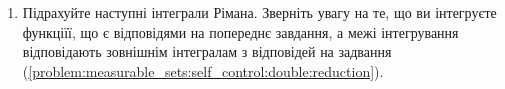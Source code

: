 \begin{enumerate}
\begin{enumerate}[label*=\arabic*.]
    \end{enumerate}
    \item\label{problem:measurable_sets:self_control:double:outer} Підрахуйте наступні інтеграли Рімана. Зверніть увагу на те, що ви інтегруєте функціїї, що є відповідями на попереднє завдання, а межі інтегрування відповідають зовнішнім інтегралам з відповідей на задвання (\ref{problem:measurable_sets:self_control:double:reduction}).
    \par\noindent
    \begin{enumerate}[label*=\arabic*.]
\end{enumerate}
\end{enumerate}
